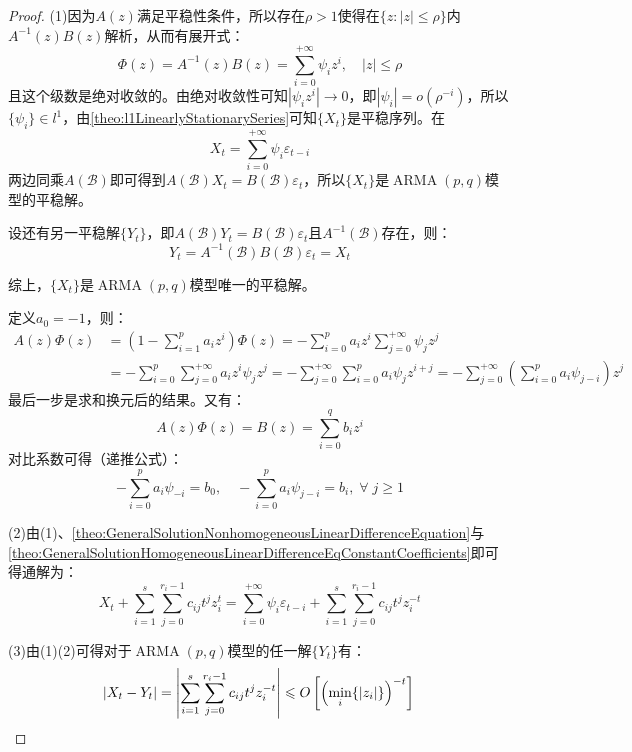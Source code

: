 \begin{proof}
	(1)因为$A(z)$满足平稳性条件，所以存在$\rho>1$使得在$\{z:|z|\leqslant\rho\}$内$A^{-1}(z)B(z)$解析，从而有展开式：
	\begin{equation*}
		\Phi(z)=A^{-1}(z)B(z)=\sum_{i=0}^{+\infty}\psi_iz^i,\quad|z|\leqslant\rho
	\end{equation*}
	且这个级数是绝对收敛的。由绝对收敛性可知$|\psi_iz^i|\to0$，即$|\psi_i|=o(\rho^{-i})$，所以$\{\psi_i\}\in l^1$，由\cref{theo:l1LinearlyStationarySeries}可知$\{X_t\}$是平稳序列。在
	\begin{equation*}
		X_t=\sum_{i=0}^{+\infty}\psi_i\varepsilon_{t-i}
	\end{equation*}
	两边同乘$A(\mathcal{B})$即可得到$A(\mathcal{B})X_t=B(\mathcal{B})\varepsilon_t$，所以$\{X_t\}$是$\operatorname{ARMA}(p,q)$模型的平稳解。\par
	设还有另一平稳解$\{Y_t\}$，即$A(\mathcal{B})Y_t=B(\mathcal{B})\varepsilon_t$且$A^{-1}(\mathcal{B})$存在，则：
	\begin{equation*}
		Y_t=A^{-1}(\mathcal{B})B(\mathcal{B})\varepsilon_t=X_t
	\end{equation*}\par
	综上，$\{X_t\}$是$\operatorname{ARMA}(p,q)$模型唯一的平稳解。\par
	定义$a_0=-1$，则：
	\begin{align*}
		A(z)\Phi(z)&=\left(1-\sum_{i=1}^{p}a_iz^i\right)\Phi(z)=-\sum_{i=0}^{p}a_iz^i\sum_{j=0}^{+\infty}\psi_jz^j \\
		&=-\sum_{i=0}^{p}\sum_{j=0}^{+\infty}a_iz^i\psi_jz^j=-\sum_{j=0}^{+\infty}\sum_{i=0}^{p}a_i\psi_jz^{i+j}=-\sum_{j=0}^{+\infty}\left(\sum_{i=0}^{p}a_i\psi_{j-i}\right)z^j	
	\end{align*}
	最后一步是求和换元后的结果。又有：
	\begin{equation*}
		A(z)\Phi(z)=B(z)=\sum_{i=0}^{q}b_iz^i
	\end{equation*}
	对比系数可得（递推公式）：
	\begin{equation*}
		-\sum_{i=0}^{p}a_i\psi_{-i}=b_0,\quad-\sum_{i=0}^{p}a_i\psi_{j-i}=b_i,\;\forall\;j\geqslant1
	\end{equation*}\par
	(2)由(1)、\cref{theo:GeneralSolutionNonhomogeneousLinearDifferenceEquation}与\cref{theo:GeneralSolutionHomogeneousLinearDifferenceEqConstantCoefficients}即可得通解为：
	\begin{equation*}
		X_t+\sum_{i=1}^{s}\sum_{j=0}^{r_i-1}c_{ij}t^{j}z_i^t=\sum_{i=0}^{+\infty}\psi_i\varepsilon_{t-i}+\sum_{i=1}^{s}\sum_{j=0}^{r_i-1}c_{ij}t^{j}z_i^{-t}
	\end{equation*}\par
	(3)由(1)(2)可得对于$\operatorname{ARMA}(p,q)$模型的任一解$\{Y_t\}$有：
	\begin{equation*}
		|X_t-Y_t|=\left|\sum_{i=1}^{s}\sum_{j=0}^{r_i-1}c_{ij}t^{j}z_i^{-t}\right|\leqslant O\left[\left(\min_i\{|z_i|\}\right)^{-t}\right]\qedhere
	\end{equation*}
\end{proof}
